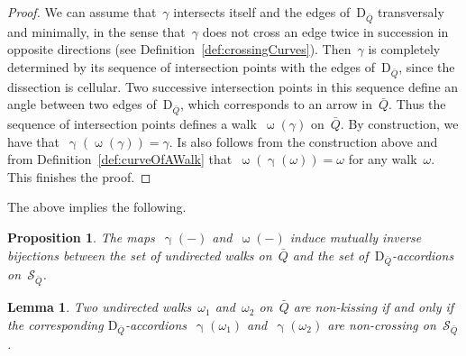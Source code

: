 \documentclass{amsart}
\newtheorem{proposition}[theorem]{Proposition}
\newtheorem{lemma}[theorem]{Lemma}
\theoremstyle{definition}
\newcommand{\walk}{\operatorname{\omega}} %
\newcommand{\surface}{\mathcal{S}} %
\newcommand{\dissection}{\mathrm{D}} %
\newcommand{\curveof}{\operatorname{\gamma}} %
\begin{document}
\begin{proof}
We can assume that~$\gamma$ intersects itself and the edges of~$\dissection_{\bar Q}$ transversaly and minimally, in the sense that~$\gamma$ does not cross an edge twice in succession in opposite directions (see Definition~\ref{def:crossingCurves}).
Then~$\gamma$ is completely determined by its sequence of intersection points with the edges of~$\dissection_{\bar Q}$, since the dissection is cellular.
Two successive intersection points in this sequence define an angle between two edges of~$\dissection_{\bar Q}$, which corresponds to an arrow in~$\bar Q$.
Thus the sequence of intersection points defines a walk~$\walk(\gamma)$ on~$\bar Q$.
By construction, we have that~$\curveof(\walk(\gamma)) = \gamma$.
Is also follows from the construction above and from Definition~\ref{def:curveOfAWalk} that~$\walk(\curveof(\omega)) = \omega$ for any walk~$\omega$.
This finishes the proof.
\end{proof}

The above implies the following.

\begin{proposition}
\label{prop:walks=arcs}
The maps~$\curveof(-)$ and~$\walk(-)$ induce mutually inverse bijections between the set of undirected walks on~$\bar Q$ and the set of~$\dissection_{\bar Q}$-accordions on~$\surface_{\bar Q}$.
\end{proposition}

\begin{lemma}
\label{lem:nonKissing=nonCrossing}
Two undirected walks~$\omega_1$ and~$\omega_2$ on~$\bar Q$ are non-kissing if and only if the corresponding $\dissection_{\bar Q}$-accordions~$\curveof(\omega_1)$ and~$\curveof(\omega_2)$ are non-crossing on~$\surface_{\bar Q}$.
\end{lemma}
\end{document}
